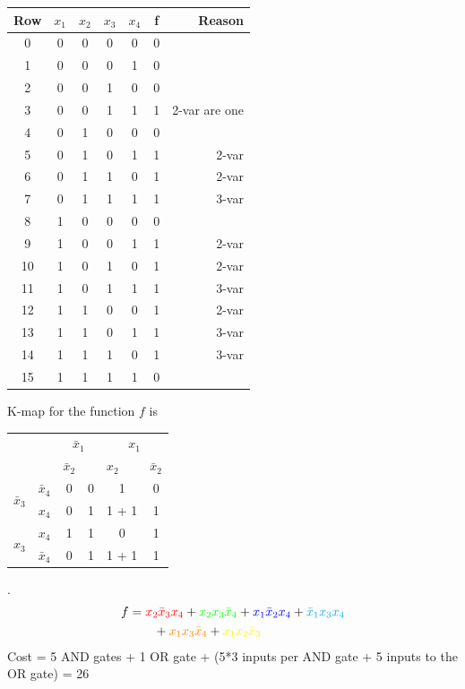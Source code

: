 \documentclass[twocolumn]{article}
\newcommand{\bx}{\bar{x}}
\newcommand{\cred}{\color{red}}
\newcommand{\cg}{\color{green}}
\newcommand{\cb}{\color{blue}}
\begin{document}
\begin{tabular}{c|cccc||c|r}
  \toprule
  Row & $x_1$  & $x_2$ & $x_3$ & $x_4$ & f & Reason\\
  \midrule
   0 & 0 & 0 &  0 & 0 & 0 & 
   \\
   1 & 0 & 0 &  0 & 1 & 0 &
   \\
   2 & 0 & 0 &  1 & 0 & 0 &
   \\
   3 & 0 & 0 &  1 & 1 & 1 & 2-var are one
   \\
   4 & 0 & 1 &  0 & 0 & 0 & 
   \\
   5 & 0 & 1 &  0 & 1 & 1 & 2-var
   \\
   6 & 0 & 1 &  1 & 0 & 1 & 2-var
   \\
   7 & 0 & 1 &  1 & 1 & 1 & 3-var
   \\
   8 & 1 & 0 &  0 & 0 & 0 & 
   \\
   9 & 1 & 0 &  0 & 1 & 1 & 2-var
  \\
  10 & 1 & 0 &  1 & 0 & 1 & 2-var
  \\
  11 & 1 & 0 &  1 & 1 & 1 & 3-var
  \\
  12 & 1 & 1 &  0 & 0 & 1 & 2-var
  \\
  13 & 1 & 1 &  0 & 1 & 1 & 3-var
  \\
  14 & 1 & 1 &  1 & 0 & 1 & 3-var
  \\
  15 & 1 & 1 &  1 & 1 & 0 &
  \\
  \bottomrule
\end{tabular}

K-map for the function $f$ is
\\
\begin{tabular}{c|c|c|c|c|c}
  \toprule
  && \multicolumn{2}{c|}{$\bx_1$} & \multicolumn{2}{c}{$x_1$}
  \\
  && $\bx_2$ & \multicolumn{2}{c|}{$x_2$} & $\bx_2$
  \\ \midrule
  \multirow{2}{*}{$\bx_3$} & $\bx_4$
                                  & 0 & 0 &  \color{yellow} 1 & 0
  \\
  & $x_4$
                                  & 0 & \cred 1 & \cred 1 + \color{yellow} 1 & \cb 1
  \\
  \multirow{2}{*}{$x_3$}   &  $x_4$
                                  & \color{cyan} 1 & \color{cyan} 1 & 0 & \cb 1
  \\
  & $\bx_4$
                                  & 0 & \cg 1 & \cg 1 + \color{orange} 1 & \color{orange} 1
  \\\bottomrule
\end{tabular}.
\\
\begin{align*}
f &= { \cred x_2 \bx_3 x_4 } +  { \cg x_2 x_3 \bx_4} + {\cb x_1 \bx_2 x_4} +
  {\color{cyan} \bx_1 x_3 x_4 }
  \\
  &\qquad + {\color{orange} x_1 x_3 \bx_4} +
{\color{yellow} x_1 x_2 \bx_3 }
  \end{align*}
 Cost = 5 AND gates + 1 OR gate + (5*3 inputs per AND gate + 5 inputs to the OR
 gate) = 26
\end{document}
